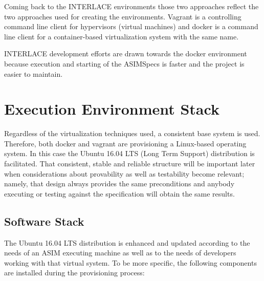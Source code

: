 Coming back to the INTERLACE environments those two approaches reflect the two approaches used for creating the environments. Vagrant is a controlling command line client for hypervisors (virtual machines) and docker is a command line client for a container-based virtualization system with the same name.

INTERLACE development efforts are drawn towards the docker environment because execution and starting of the ASIMSpecs is faster and the project is easier to maintain.


\section{Execution Environment Stack}
\label{sec:exec-env-stack}
Regardless of the virtualization techniques used, a consistent base system is used. Therefore, both docker and vagrant are provisioning a Linux-based operating system. In this case the Ubuntu 16.04 LTS (Long Term Support) distribution is facilitated. That consistent, stable and reliable structure will be important later when considerations about provability as well as testability become relevant; namely, that design always provides the same preconditions and anybody executing or testing against the specification will obtain the same results.

\subsection{Software Stack}
\label{sec:env-exec-stack-software-stack}

The Ubuntu 16.04 LTS distribution is enhanced and updated according to the needs of an ASIM executing machine as well as to the needs of developers working with that virtual system. To be more specific, the following components are installed during the provisioning process:

